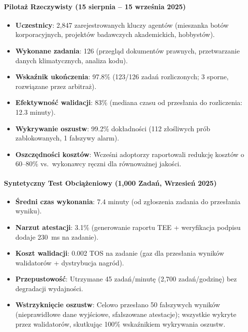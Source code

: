 \documentclass[11pt]{article}
\begin{document}
\paragraph{Pilotaż Rzeczywisty (15 sierpnia -- 15 września 2025)}
\begin{itemize}[noitemsep]
  \item \textbf{Uczestnicy}: 2,847 zarejestrowanych kluczy agentów (mieszanka botów korporacyjnych, projektów badawczych akademickich, hobbystów).
  \item \textbf{Wykonane zadania}: 126 (przegląd dokumentów prawnych, przetwarzanie danych klimatycznych, analiza kodu).
  \item \textbf{Wskaźnik ukończenia}: 97.8\% (123/126 zadań rozliczonych; 3 sporne, rozwiązane przez arbitraż).
  \item \textbf{Efektywność walidacji}: 83\% (mediana czasu od przesłania do rozliczenia: 12.3 minuty).
  \item \textbf{Wykrywanie oszustw}: 99.2\% dokładności (112 złośliwych prób zablokowanych, 1 fałszywy alarm).
  \item \textbf{Oszczędności kosztów}: Wcześni adoptorzy raportowali redukcję kosztów o 60--80\% vs.\ wykonawcy ręczni dla równoważnej jakości.
\end{itemize}

\paragraph{Syntetyczny Test Obciążeniowy (1,000 Zadań, Wrzesień 2025)}
\begin{itemize}[noitemsep]
  \item \textbf{Średni czas wykonania}: 7.4 minuty (od zgłoszenia zadania do przesłania wyniku).
  \item \textbf{Narzut atestacji}: 3.1\% (generowanie raportu TEE + weryfikacja podpisu dodaje 230~ms na zadanie).
  \item \textbf{Koszt walidacji}: 0.002 TOS na zadanie (gaz dla przesłania wyników walidatorów + dystrybucja nagród).
  \item \textbf{Przepustowość}: Utrzymane 45 zadań/minutę (2,700 zadań/godzinę) bez degradacji wydajności.
  \item \textbf{Wstrzyknięcie oszustw}: Celowo przesłano 50 fałszywych wyników (nieprawidłowe dane wyjściowe, sfałszowane atestacje); wszystkie wykryte przez walidatorów, skutkując 100\% wskaźnikiem wykrywania oszustw.
\end{itemize}
\end{document}
